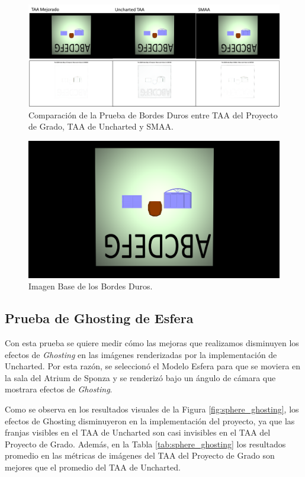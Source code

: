 \documentclass[pregrado]{tesis-usb} %
\begin{document}
\begin{figure}[!htb]
	\centering
	\includegraphics[scale=0.4]{images/results/hard_test.png}
	\caption{Comparación de la Prueba de Bordes Duros entre TAA del Proyecto de Grado, TAA de Uncharted y SMAA.}\label{fig:hard_test_render}
\end{figure}

\begin{figure}[!htb]
	\centering
	\includegraphics[scale=0.09]{images/results/hard_test_sobel_ground_truth.png}
	\caption{Imagen Base de los Bordes Duros.}\label{fig:hard_test_truth}
\end{figure}

\FloatBarrier

\subsection{Prueba de Ghosting de Esfera}
Con esta prueba se quiere medir cómo las mejoras que realizamos disminuyen los efectos de \textit{Ghosting} en las imágenes renderizadas por la implementación de Uncharted. Por esta razón, se seleccionó el Modelo Esfera para que se moviera en la sala del Atrium de Sponza y se renderizó bajo un ángulo de cámara que mostrara efectos de \textit{Ghosting}.

Como se observa en los resultados visuales de la Figura \ref{fig:sphere_ghosting}, los efectos de  Ghosting disminuyeron en la implementación del proyecto, ya que las franjas visibles en el TAA de Uncharted son casi invisibles en el TAA del Proyecto de Grado. Además, en la Tabla \ref{tab:sphere_ghosting} los resultados promedio en las métricas de imágenes del TAA del Proyecto de Grado son mejores que el promedio del TAA de Uncharted.
\end{document}
